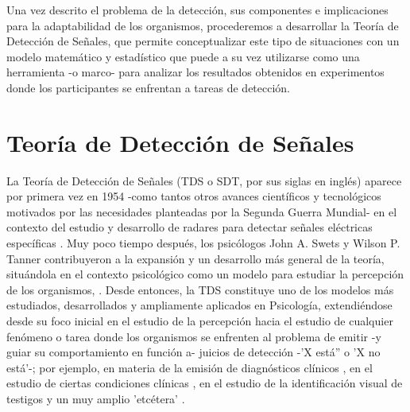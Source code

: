 Una vez descrito el problema de la detección, sus componentes e implicaciones para la adaptabilidad de los organismos, procederemos a desarrollar la Teoría de Detección de Señales, que permite conceptualizar este tipo de situaciones con un modelo matemático y estadístico que puede a su vez utilizarse como una herramienta -o marco- para analizar los resultados obtenidos en experimentos donde los participantes se enfrentan a tareas de detección.\\

\section{Teoría de Detección de Señales}

La Teoría de Detección de Señales (TDS o SDT, por sus siglas en inglés) aparece por primera vez en 1954 -como tantos otros avances científicos y tecnológicos motivados por las necesidades planteadas por la Segunda Guerra Mundial- en el contexto del estudio y desarrollo de radares para detectar señales eléctricas específicas \parencite{Peterson1954}. Muy poco tiempo después, los psicólogos John A. Swets y Wilson P. Tanner contribuyeron a la expansión y un desarrollo más general de la teoría, situándola en el contexto psicológico como un modelo para estudiar la percepción de los organismos, \parencite{Tanner1954, Swets1961}. Desde entonces, la TDS constituye uno de los modelos más estudiados, desarrollados y ampliamente aplicados en Psicología, extendiéndose desde su foco inicial en el estudio de la percepción \parencite{Rosenholtz2001, Pessoa2005, Wallis2007} hacia el estudio de cualquier fenómeno o tarea donde los organismos se enfrenten al problema de emitir -y guiar su comportamiento en función a- juicios de detección -'X está'' o 'X no está'-; por ejemplo, en materia de la emisión de diagnósticos clínicos \parencite{Grossberg1978, Swets2000, Boutis2010}, en el estudio de ciertas condiciones clínicas \parencite{Westermann2010, Bonnel2003, Brown1994, Naliboff1981}, en el estudio de la identificación visual de testigos \parencite{Gronlund2014, Wixted2014, Wixted2016} y un muy amplio 'etcétera' \parencite{Gordon1974, Nuechterlein1983, Harvey1992, Verghese2001}.\\ 

